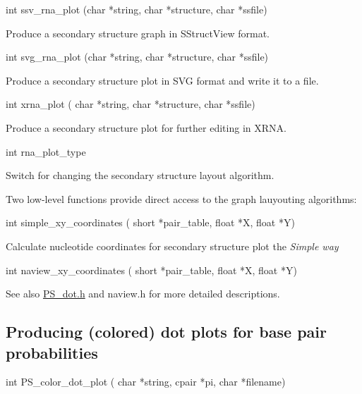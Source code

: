 \begin{DoxyVerb}int ssv_rna_plot (char *string,
                  char *structure,
                  char *ssfile)
\end{DoxyVerb}
 Produce a secondary structure graph in S\+Struct\+View format.

\begin{DoxyVerb}int svg_rna_plot (char *string,
                  char *structure,
                  char *ssfile)
\end{DoxyVerb}
 Produce a secondary structure plot in S\+VG format and write it to a file.

\begin{DoxyVerb}int xrna_plot ( char *string,
                char *structure,
                char *ssfile)
\end{DoxyVerb}
 Produce a secondary structure plot for further editing in X\+R\+NA.

\begin{DoxyVerb}int rna_plot_type
\end{DoxyVerb}
 Switch for changing the secondary structure layout algorithm.

Two low-\/level functions provide direct access to the graph lauyouting algorithms\+:

\begin{DoxyVerb}int simple_xy_coordinates ( short *pair_table,
                            float *X,
                            float *Y)
\end{DoxyVerb}
 Calculate nucleotide coordinates for secondary structure plot the {\itshape Simple way}

\begin{DoxyVerb}int naview_xy_coordinates ( short *pair_table,
                            float *X,
                            float *Y)
\end{DoxyVerb}


\begin{DoxySeeAlso}{See also}
\mbox{\hyperlink{PS__dot_8h}{P\+S\+\_\+dot.\+h}} and naview.\+h for more detailed descriptions.
\end{DoxySeeAlso}
\hypertarget{plots_utils_dot}{}\subsection{Producing (colored) dot plots for base pair probabilities}\label{plots_utils_dot}
\begin{DoxyVerb}int PS_color_dot_plot ( char *string,
                        cpair *pi,
                        char *filename)
\end{DoxyVerb}


